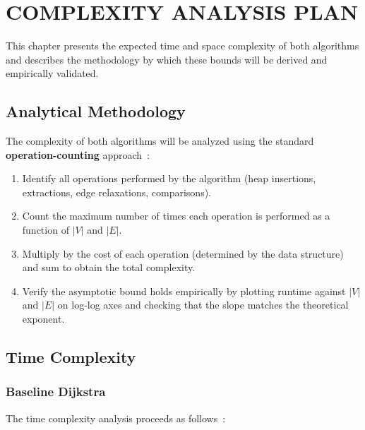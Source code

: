 \chapter{COMPLEXITY ANALYSIS PLAN}\label{chap:complexity}

This chapter presents the expected time and space complexity of both algorithms and describes the methodology by which these bounds will be derived and empirically validated.

\section{Analytical Methodology}

The complexity of both algorithms will be analyzed using the standard \textbf{operation-counting} approach~\citep{cormen2009}:
\begin{enumerate}
    \item Identify all operations performed by the algorithm (heap insertions, extractions, edge relaxations, comparisons).
    \item Count the maximum number of times each operation is performed as a function of $|V|$ and $|E|$.
    \item Multiply by the cost of each operation (determined by the data structure) and sum to obtain the total complexity.
    \item Verify the asymptotic bound holds empirically by plotting runtime against $|V|$ and $|E|$ on log-log axes and checking that the slope matches the theoretical exponent.
\end{enumerate}

\section{Time Complexity}

\subsection{Baseline Dijkstra}

The time complexity analysis proceeds as follows~\citep{cormen2009,dijkstra1959}:

